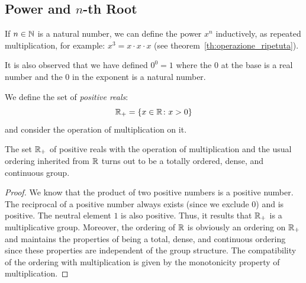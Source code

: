 \subsection{Power and $n$-th Root}
%
%
\label{sec:potenza}%
\label{sec:radice}%

If $n \in {\mathbb N}$ is a natural number, we can define 
the power $x^n$ inductively, as repeated multiplication, for example: $x^3 =
x\cdot x \cdot x$
(see theorem~\ref{th:operazione_ripetuta}).

It is also observed that we have defined $0^0=1$ where the $0$ 
at the base is a real number and the $0$ in the exponent 
is a natural number.


We define the set of \emph{positive reals}:
\[
{\mathbb R}_+ = {\left\{ x\in {\mathbb R}\colon x>0 \right\}}
\]
and consider the operation of multiplication on it.

\begin{theorem}
  \label{th:gruppo_moltiplicativo}%
The set ${\mathbb R}_+$ of positive reals with the operation of multiplication 
and the usual ordering inherited from ${\mathbb R}$ turns out to be 
a totally ordered, dense, and continuous group.
\end{theorem}
%
\begin{proof}
We know that the product of two positive numbers 
is a positive number. The reciprocal of a positive number
always exists (since we exclude $0$) and is positive. 
The neutral element $1$ is also positive. 
Thus, it results that ${\mathbb R}_+$ is a multiplicative group.
Moreover, the ordering of ${\mathbb R}$ is obviously an ordering on ${\mathbb R}_+$
and maintains the properties of being a total, dense, and continuous ordering
since these properties are independent of the group structure.
The compatibility of the ordering with multiplication 
is given by the monotonicity property of multiplication.
\end{proof}

